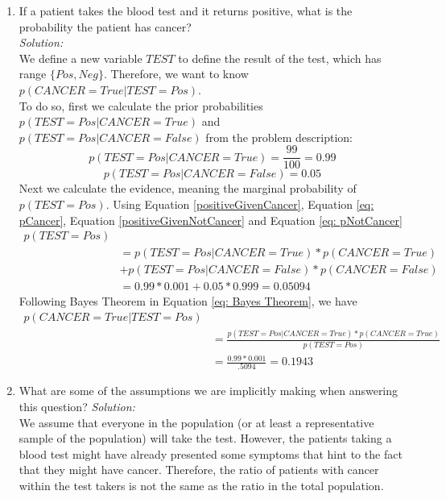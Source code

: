 \documentclass{../amsml}
\begin{document}
\begin{problem}
\begin{enumerate}
	\item If a patient takes the blood test and it returns positive, what is the probability the patient has cancer? \\
		\emph{Solution:} \\
			We define a new variable $TEST$ to define the result of the test, which has range $\{Pos, Neg\}$. Therefore, we want to know $p(CANCER = True | TEST = Pos)$. \\
			To do so, first we calculate the prior probabilities $p(TEST = Pos | CANCER = True)$ and $p(TEST = Pos | CANCER = False)$ from the problem description:
			\begin{equation} \label{positiveGivenCancer}
				p(TEST = Pos | CANCER = True) = \frac{99}{100} = 0.99
			\end{equation}
			\begin{equation} \label{positiveGivenNotCancer}
				p(TEST = Pos | CANCER = False) = 0.05
			\end{equation}
			Next we calculate the evidence, meaning the marginal probability of $p(TEST = Pos)$. Using Equation \ref{positiveGivenCancer}, Equation \ref{eq: pCancer}, Equation \ref{positiveGivenNotCancer} and Equation \ref{eq: pNotCancer}
			\begin{equation}
				\begin{split}
					p(TEST = Pos) \\
					& = p(TEST = Pos | CANCER = True) * p(CANCER = True) \\
					& + p(TEST = Pos | CANCER = False) * p(CANCER = False) \\
					& =  0.99 * 0.001 + 0.05 * 0.999 = 0.05094
				\end{split}
			\end{equation}
			Following Bayes Theorem in Equation \ref{eq: Bayes Theorem}, we have 
			\begin{equation}
				\begin{split}
					p(CANCER = True | TEST = Pos) \\
					& = \frac{p(TEST = Pos | CANCER = True) * p(CANCER = True)}{p(TEST = Pos)} \\
					& = \frac{0.99 * 0.001}{.5094} = 0.1943
				\end{split}
			\end{equation}
			
	\item What are some of the assumptions we are implicitly making when answering this question?
		\emph{Solution:} \\
			We assume that everyone in the population (or at least a representative sample of the population) will take the test. However, the patients taking a blood test might have already presented some symptoms that hint to the fact that they might have cancer. Therefore, the ratio of patients with cancer within the test takers is not the same as the ratio in the total population. 

\end{enumerate}
\end{problem}
\end{document}
